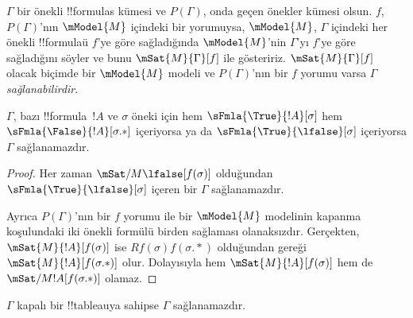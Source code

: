 \begin{defn}
  $\Gamma$ bir önekli !!{formula}s kümesi ve $P(\Gamma)$, onda geçen önekler
  kümesi olsun. $f$, $P(\Gamma)$'nın $\mModel{M}$ içindeki bir yorumuysa,
  $\mModel{M}$, $\Gamma$ içindeki her önekli !!{formula}{}ü $f$'ye göre
  sağladığında $\mModel{M}$'nin $\Gamma$'yı $f$'ye göre sağladığını söyler ve
  bunu $\mSat{M}{\Gamma}[f]$ ile gösteririz. $\mSat{M}{\Gamma}[f]$ olacak
  biçimde bir $\mModel{M}$ modeli ve $P(\Gamma)$'nın bir $f$ yorumu varsa
  $\Gamma$ \emph{sağlanabilirdir}.
\end{defn}

\begin{prop}
  $\Gamma$, bazı !!{formula}~$!A$ ve $\sigma$ öneki için hem
  $\sFmla{\True}{!A}[\sigma]$ hem $\sFmla{\False}{!A}[\sigma.{*}]$ içeriyorsa
  ya da $\sFmla{\True}{\lfalse}[\sigma]$ içeriyorsa $\Gamma$ sağlanamazdır.
\end{prop}

\begin{proof}
  Her zaman $\mSat/{M}{\lfalse}[f(\sigma)]$ olduğundan
  $\sFmla{\True}{\lfalse}[\sigma]$ içeren bir $\Gamma$ sağlanamazdır.

  Ayrıca $P(\Gamma)$'nın bir $f$ yorumu ile bir $\mModel{M}$ modelinin
  kapanma koşulundaki iki önekli formülü birden sağlaması olanaksızdır.
  Gerçekten,
  $\mSat{M}{!A}[f(\sigma)]$ ise $Rf(\sigma)f(\sigma.{*})$ olduğundan
   gereği
  $\mSat{M}{!A}[f(\sigma.{*})]$ olur. Dolayısıyla hem
  $\mSat{M}{!A}[f(\sigma)]$ hem de
  $\mSat/{M}{!A}[f(\sigma.{*})]$ olamaz.
\end{proof}

\begin{thm}[Sağlamlık]
  $\Gamma$ kapalı bir !!{tableau}{}ya sahipse $\Gamma$ sağlanamazdır.
\end{thm}

